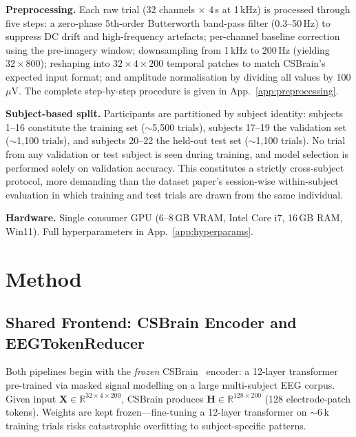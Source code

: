 \documentclass{article}
\begin{document}
\textbf{Preprocessing.} Each raw trial (32 channels $\times$ 4\,s at 1\,kHz) is processed through five steps: a zero-phase 5th-order Butterworth band-pass filter (0.3--50\,Hz) to suppress DC drift and high-frequency artefacts; per-channel baseline correction using the pre-imagery window; downsampling from 1\,kHz to 200\,Hz (yielding $32{\times}800$); reshaping into $32{\times}4{\times}200$ temporal patches to match CSBrain's expected input format; and amplitude normalisation by dividing all values by 100\,$\mu$V. The complete step-by-step procedure is given in App.~\ref{app:preprocessing}.

\textbf{Subject-based split.} Participants are partitioned by subject identity: subjects 1--16 constitute the training set ($\sim$5{,}500 trials), subjects 17--19 the validation set ($\sim$1{,}100 trials), and subjects 20--22 the held-out test set ($\sim$1{,}100 trials). No trial from any validation or test subject is seen during training, and model selection is performed solely on validation accuracy. This constitutes a strictly cross-subject protocol, more demanding than the dataset paper's session-wise within-subject evaluation in which training and test trials are drawn from the same individual.

\textbf{Hardware.} Single consumer GPU (6--8\,GB VRAM, Intel Core i7, 16\,GB RAM, Win11). Full hyperparameters in App.~\ref{app:hyperparams}.

\section{Method}

\subsection{Shared Frontend: CSBrain Encoder and EEGTokenReducer}

Both pipelines begin with the \emph{frozen} CSBrain~\citep{zhu2024csbrain} encoder: a 12-layer transformer pre-trained via masked signal modelling on a large multi-subject EEG corpus. Given input $\mathbf{X}\in\mathbb{R}^{32\times4\times200}$, CSBrain produces $\mathbf{H}\in\mathbb{R}^{128\times200}$ (128 electrode-patch tokens). Weights are kept frozen---fine-tuning a 12-layer transformer on $\sim$6\,k training trials risks catastrophic overfitting to subject-specific patterns.
\end{document}
